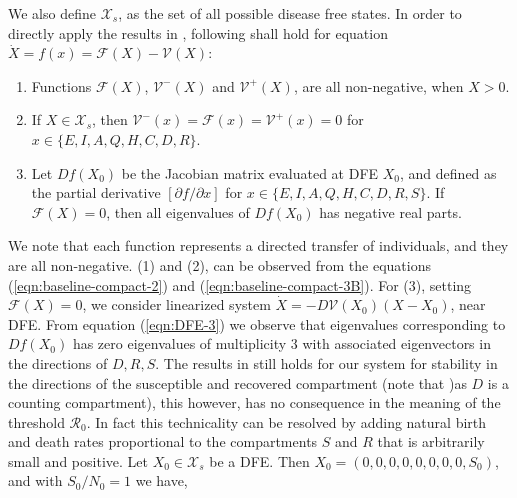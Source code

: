 \documentclass[fleqn,10pt]{wlscirep}
\begin{document}
%
%
We also define $\mathcal{X}_s$, as the set of all possible disease free states. In order to directly apply the results in \cite{VANDENDRIESSCHE200229}, following shall hold for equation $\dot{X} = f(x) = \mathcal{F}(X) - \mathcal{V}(X)$:
\begin{enumerate}
	\item Functions $\mathcal{F}(X)$, $\mathcal{V}^{-}(X)$ and $\mathcal{V}^{+}(X)$, are all non-negative, when $X > 0$.
	\item If $X \in \mathcal{X}_s$, then $\mathcal{V}^{-}(x)=\mathcal{F}(x)=\mathcal{V}^{+}(x)=0$ for $x \in \{E, I, A, Q, H, C, D, R\}$.
	\item Let $Df(X_0)$ be the Jacobian matrix evaluated at DFE $X_0$, and defined as the partial derivative $[{\partial f}/{\partial x}]$ for $x \in \{E, I, A, Q, H, C, D, R, S\}$. If $\mathcal{F}(X) = 0$, then all eigenvalues of $Df(X_0)$ has negative real parts.
\end{enumerate}
We note that each function represents a directed transfer of individuals, and they are all non-negative. (1) and (2), can be observed from the equations (\ref{eqn:baseline-compact-2}) and (\ref{eqn:baseline-compact-3B}).  For (3), setting $\mathcal{F}(X) = 0$, we consider linearized system $\dot{X} = - D\mathcal{V}(X_0)(X-X_0)$, near DFE. From equation (\ref{eqn:DFE-3}) we observe that eigenvalues corresponding to $Df(X_0)$ has zero eigenvalues of multiplicity $3$ with associated eigenvectors in the directions of $D, R, S$. The results in \cite{VANDENDRIESSCHE200229} still holds for our system for stability in the directions of the susceptible and recovered compartment (note that )as $D$ is a counting compartment), this however, has no consequence in the meaning of the threshold $\mathcal{R}_0$. In fact this technicality can be resolved by adding natural birth and death rates proportional to the compartments $S$ and $R$ that is arbitrarily small and positive. 
%
%
Let $X_0 \in \mathcal{X}_s$ be a DFE. Then $X_0 = \left( 0, 0, 0, 0, 0, 0, 0, 0, S_0 \right) $, and with $S_0/N_0=1$ we have, 
%
%
\end{document}
